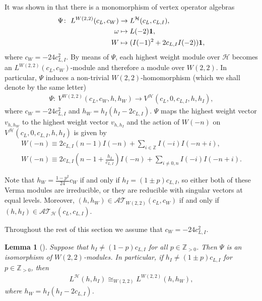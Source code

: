 \documentclass[11pt]{article}
\numberwithin{equation}{section}
\newtheorem{Lemma}[Theorem]{Lemma}
\newcommand{\N}{{\mathbb Z}_{> 0} }
\newcommand{\Z}{\mathbb Z}
\newcommand{\HVir}{\mathcal H}
\begin{document}
It was shown in \cite{nas} that there is a monomorphism of vertex operator algebras
\begin{align}
\Psi \colon \ L^{W(2,2)}(c_{L},c_{W})& \rightarrow L^{\HVir}(c_{L},c_{L,I}),\label{Psi} \\
\omega & \mapsto L(-2)\mathbf{1}, \notag \\
W& \mapsto (I(-1)^{2}+2c_{L,I}I(-2))\mathbf{1}, \notag
\end{align}%
where $c_{W}=-24c_{L,I}^{2}$. By means of $\Psi $, each highest weight module over $\HVir$ becomes an \linebreak $L^{W(2,2)}(c_{L},c_{W})$-module and
therefore a module over $W(2,2) $. In particular, $\Psi $ induces a non-trivial $W(2,2)$-homomorphism (which we shall denote by the same letter)
\begin{gather*}
\Psi \colon \ V^{W(2,2)}(c_{L},c_{W},h,h_{W}) \rightarrow V^{\HVir} ( c_{L},0,c_{L,I},h,h_{I} ),
\end{gather*}
where $c_{W}=-24c_{L,I}^{2}$ and $h_{W}=h_{I}(h_{I}-2c_{L,I})$. $\Psi$ maps the highest weight vector $v_{h,h_{W}}$ to the highest weight vector
$v_{h,h_{I}}$ and the action of $W(-n)$ on $V^{\HVir} ( c_{L},0,c_{L,I},h,h_{I} )$ is given by
\begin{gather}
W(-n) \equiv 2c_{L,I}(n-1) I(-n)+\sum_{i\in \Z}I(-i)I(-n+i),\label{W u I} \\
W(-n) \equiv 2 c_{L,I}\left(n- 1 + \frac{h_I}{c_{L,I} } \right) I(- n)+\sum_{i\ne 0,n } I(-i)I(- n+i).\nonumber
\end{gather}

Note that $h_{W}=\frac{1-p^{2}}{24}c_{W}$ if and only if $h_{I}= ( 1\pm p) c_{L,I}$, so either both of these Verma modules are irreducible, or they are reducible with singular vectors at equal levels. Moreover, $ (h,h_W) \in {\mathcal {AT} }_{W(2,2)} ( c_L, c_W ) $ if and only if $(h,h_I) \in {\mathcal {AT} }_{\HVir} ( c_L, c_{L,I} )$.

Throughout the rest of this section we assume that $ c_W = -24c_{L,I}^2 $.

\begin{Lemma}[{\cite[Lemma 7.2]{nas}}] \label{psi}Suppose that $h_{I}\neq(1-p) c_{L,I}$ for all $p\in \N$. Then $\Psi$ is an isomorphism of $W(2,2)$-modules. In particular, if $ h_I \neq (1\pm p) c_{L,I} $ for $p \in \N $, then
\begin{gather*}
L^{\HVir}(h,h_I)\cong_{W(2,2)}L^{W(2,2)}(h,h_W),
\end{gather*}
where $h_W = h_I (h_I-2c_{L,I}) $.
\end{Lemma}
\end{document}
